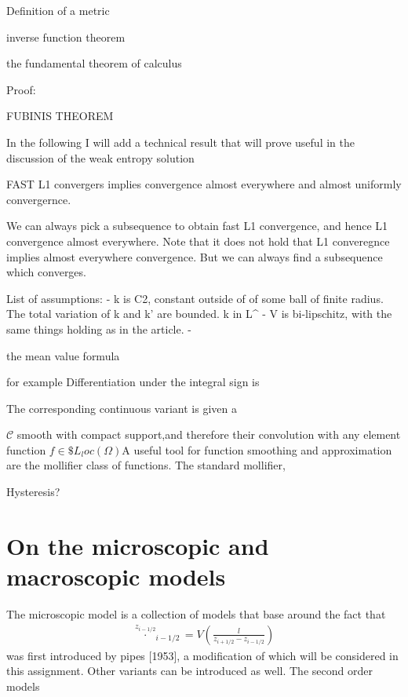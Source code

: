 \begin{}


Definition of a metric

inverse function theorem

the fundamental theorem of calculus

Proof: 

FUBINIS THEOREM 

In the following I will add a technical result that will prove useful in the discussion of the weak entropy solution

FAST L1 convergers implies convergence almost everywhere and almost uniformly convergernce. 

\begin{}

We can always pick a subsequence to obtain fast L1 convergence, and hence L1 convergence almost everywhere. 
Note that it does not hold that L1 converegnce implies almost everywhere convergence. But we can always find a subsequence which converges. 

List of assumptions: 
- k is C2, constant outside of of some ball of finite radius. The total variation of k and k' are bounded. k in L^\infty 
- V is bi-lipschitz, with the same things holding as in the article. 
- 


the mean value formula 

for example
Differentiation under the integral sign is 

The corresponding continuous variant is given a





$\mathscr{C}$
smooth with compact support,and therefore their convolution with any element function $f \in \$L_loc(\Omega)$A useful tool for function smoothing and approximation are the mollifier class of functions. The standard mollifier, 


Hysteresis?

\section{On the microscopic and macroscopic models}



The microscopic model is a collection of models that base around the fact that
\begin{align}
    \overset{z_{i-1/2}}{\cdot}_{i-1/2} = V\left(\frac{l}{z_{i+1/2} - z_{i-1/2}}\right)
\end{align}
was first introduced by pipes [1953], a modification of which will be considered in this assignment. Other variants can be introduced as well. The second order models 


\end{}
\end{}
